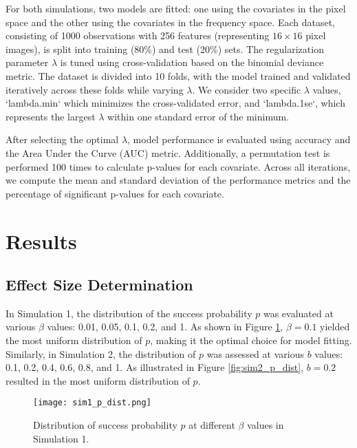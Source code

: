\documentclass[12pt]{article}
\begin{document}
For both simulations, two models are fitted: one using the covariates in the pixel space and the other using the
covariates in the frequency space. Each dataset, consisting of 1000 observations with 256 features (representing \( 16
\times 16 \) pixel images), is split into training (80\%) and test (20\%) sets. The regularization parameter \( \lambda
\) is tuned using cross-validation based on the binomial deviance metric. The dataset is divided into 10 folds, with the
model trained and validated iteratively across these folds while varying \( \lambda \). We consider two specific \(
\lambda \) values, `lambda.min` which minimizes the cross-validated error, and `lambda.1se`, which represents the
largest \( \lambda \) within one standard error of the minimum.

After selecting the optimal \( \lambda \), model performance is evaluated using accuracy and the Area Under the Curve (AUC) metric. Additionally, a permutation test is performed 100 times to calculate p-values for each covariate. Across all iterations, we compute the mean and standard deviation of the performance metrics and the percentage of significant p-values for each covariate.


\section*{Results}

\subsection*{Effect Size Determination}

In Simulation 1, the distribution of the success probability \( p \) was evaluated at various \( \beta \) values: 0.01,
0.05, 0.1, 0.2, and 1. As shown in Figure \ref{fig:sim1_p_dist}, \( \beta = 0.1 \) yielded the most uniform distribution
of \( p \), making it the optimal choice for model fitting. Similarly, in Simulation 2, the distribution of \( p \) was assessed at various \( b \) values: 0.1, 0.2, 0.4, 0.6, 0.8, and 1. As illustrated in Figure \ref{fig:sim2_p_dist}, \( b = 0.2 \) resulted in the most uniform distribution of \( p \).

\begin{figure}[h!]
	\centering
	\texttt{[image: sim1\_p\_dist.png]}
	\caption{Distribution of success probability \( p \) at different \( \beta \) values in Simulation 1.}
	\label{fig:sim1_p_dist}
\end{figure}
\end{document}
